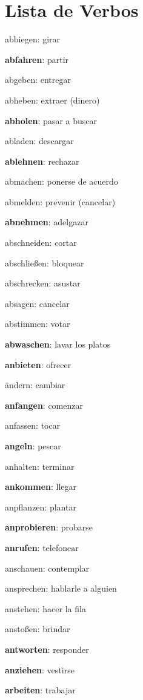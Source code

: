 \section{Lista de Verbos}
\begin{multicols}{2}
\begin{myitemize}
\item abbiegen: girar
\item \textbf{abfahren}: partir
\item abgeben: entregar
\item abheben: extraer (dinero)
\item \textbf{abholen}: pasar a buscar
\item abladen: descargar
\item \textbf{ablehnen}: rechazar
\item abmachen: ponerse de acuerdo
\item abmelden: prevenir (cancelar)
\item \textbf{abnehmen}: adelgazar
\item abschneiden: cortar
\item abschließen: bloquear
\item abschrecken: asustar
\item absagen: cancelar
\item abstimmen: votar
\item \textbf{abwaschen}: lavar los platos
\item \textbf{anbieten}: ofrecer
\item ändern: cambiar
\item \textbf{anfangen}: comenzar
\item anfassen: tocar
\item \textbf{angeln}: pescar
\item anhalten: terminar
\item \textbf{ankommen}: llegar
\item anpflanzen: plantar
\item \textbf{anprobieren}: probarse
\item \textbf{anrufen}: telefonear
\item anschauen: contemplar
\item ansprechen: hablarle a alguien
\item anstehen: hacer la fila
\item anstoßen: brindar
\item \textbf{antworten}: responder
\item \textbf{anziehen}: vestirse
\item \textbf{arbeiten}: trabajar

\end{myitemize}
\end{multicols}
